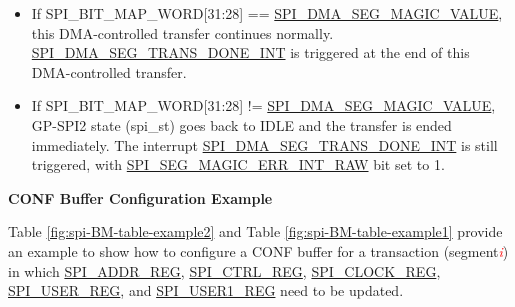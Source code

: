 \documentclass[main\_\_EN.tex]{subfiles}
\begin{document}
    \begin{itemize}
        \item If SPI\_BIT\_MAP\_WORD[31:28] == \hyperref[fielddesc:SPIDMASEGMAGICVALUE]{SPI\_DMA\_SEG\_MAGIC\_VALUE}, this DMA-controlled transfer continues normally. \hyperref[int:SPIDMASEGTRANSDONEINT]{SPI\_DMA\_SEG\_TRANS\_DONE\_INT} is triggered at the end of this DMA-controlled transfer.
        \item If SPI\_BIT\_MAP\_WORD[31:28] != \hyperref[fielddesc:SPIDMASEGMAGICVALUE]{SPI\_DMA\_SEG\_MAGIC\_VALUE}, GP-SPI2 state (spi\_st) goes back to IDLE and the transfer is ended immediately. The interrupt \hyperref[int:SPIDMASEGTRANSDONEINT]{SPI\_DMA\_SEG\_TRANS\_DONE\_INT} is still triggered, with \hyperref[fielddesc:SPISEGMAGICERRINTRAW]{SPI\_SEG\_MAGIC\_ERR\_INT\_RAW} bit set to 1.
    \end{itemize}

\textbf{CONF Buffer Configuration Example}\label{sec:gp-spi2-sct-conf-buffer}

Table \ref{fig:spi-BM-table-example2} and Table \ref{fig:spi-BM-table-example1} provide an example to show how to configure a CONF buffer for a transaction (segment\textcolor{red}{\it i}) in which \hyperref[regdesc:SPIADDRREG]{SPI\_ADDR\_REG}, \hyperref[regdesc:SPICTRLREG]{SPI\_CTRL\_REG}, \hyperref[regdesc:SPICLOCKREG]{SPI\_CLOCK\_REG}, \hyperref[regdesc:SPIUSERREG]{SPI\_USER\_REG}, and \hyperref[regdesc:SPIUSER1REG]{SPI\_USER1\_REG} need to be updated.
\end{document}
